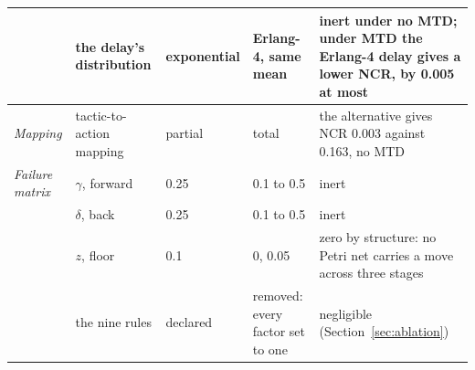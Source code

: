 \begin{table}[htbp]
\begin{tabular}{@{}P{1.6cm}P{2.8cm}P{1.9cm}P{2.5cm}P{6.4cm}@{}}
     & the delay's distribution & exponential & Erlang-4, same mean & inert under no MTD; under MTD the Erlang-4 delay gives a lower NCR, by 0.005 at most \\
    \midrule
    \emph{Mapping} & tactic-to-action mapping & partial & total & the alternative gives NCR 0.003 against 0.163, no MTD \\
    \midrule
    \emph{Failure matrix} & $\gamma$, forward & 0.25 & 0.1 to 0.5 & inert \\
     & $\delta$, back & 0.25 & 0.1 to 0.5 & inert \\
     & $z$, floor & 0.1 & 0, 0.05 & zero by structure: no Petri net carries a move across three stages \\
     & the nine rules & declared & removed: every factor set to one & negligible (Section~\ref{sec:ablation}) \\
    \bottomrule
  \end{tabular}
\end{table}
